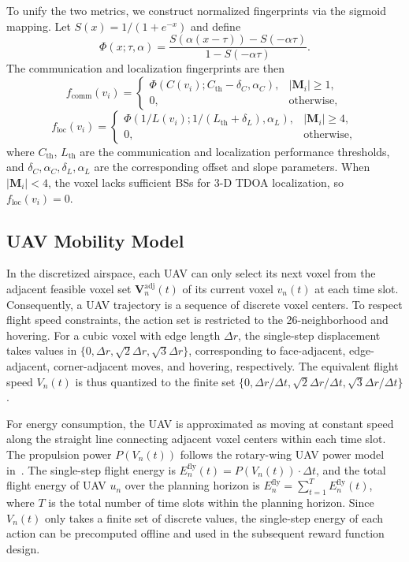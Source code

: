 \documentclass[lettersize,journal]{IEEEtran}
\begin{document}
To unify the two metrics, we construct normalized fingerprints via the sigmoid mapping. Let $S(x)=1/(1+e^{-x})$ and define
\begin{equation}
\Phi(x;\tau,\alpha)=\frac{S(\alpha(x-\tau))-S(-\alpha\tau)}{1-S(-\alpha\tau)}.
\end{equation}
The communication and localization fingerprints are then
\begin{equation}
f_{\mathrm{comm}}(v_i)=
\begin{cases}
\Phi(C(v_i);C_{\mathrm{th}}-\delta_C,\alpha_C), & |\mathbf{M}_i|\ge 1,\\
0, & \mathrm{otherwise},
\end{cases}
\end{equation}
\begin{equation}
f_{\mathrm{loc}}(v_i)=
\begin{cases}
\Phi(1/L(v_i);1/(L_{\mathrm{th}}+\delta_L),\alpha_L), & |\mathbf{M}_i|\ge 4,\\
0, & \mathrm{otherwise},
\end{cases}
\end{equation}
where $C_{\mathrm{th}}$, $L_{\mathrm{th}}$ are the communication and localization performance thresholds, and $\delta_C,\alpha_C,\delta_L,\alpha_L$ are the corresponding offset and slope parameters. When $|\mathbf{M}_i|<4$, the voxel lacks sufficient BSs for 3-D TDOA localization, so $f_{\mathrm{loc}}(v_i)=0$.

\subsection{UAV Mobility Model}

In the discretized airspace, each UAV can only select its next voxel from the adjacent feasible voxel set $\mathbf{V}_n^{\mathrm{adj}}(t)$ of its current voxel $v_n(t)$ at each time slot. Consequently, a UAV trajectory is a sequence of discrete voxel centers. To respect flight speed constraints, the action set is restricted to the 26-neighborhood and hovering. For a cubic voxel with edge length $\Delta r$, the single-step displacement takes values in $\{0,\Delta r,\sqrt{2}\Delta r,\sqrt{3}\Delta r\}$, corresponding to face-adjacent, edge-adjacent, corner-adjacent moves, and hovering, respectively. The equivalent flight speed $V_n(t)$ is thus quantized to the finite set $\{0,\Delta r/\Delta t,\sqrt{2}\Delta r/\Delta t,\sqrt{3}\Delta r/\Delta t\}$.

For energy consumption, the UAV is approximated as moving at constant speed along the straight line connecting adjacent voxel centers within each time slot. The propulsion power $P(V_n(t))$ follows the rotary-wing UAV power model in~\cite{ref17}. The single-step flight energy is $E_n^{\mathrm{fly}}(t)=P(V_n(t))\cdot\Delta t$, and the total flight energy of UAV $u_n$ over the planning horizon is $E_n^{\mathrm{fly}}=\sum_{t=1}^{T}E_n^{\mathrm{fly}}(t)$, where $T$ is the total number of time slots within the planning horizon. Since $V_n(t)$ only takes a finite set of discrete values, the single-step energy of each action can be precomputed offline and used in the subsequent reward function design.
\end{document}
